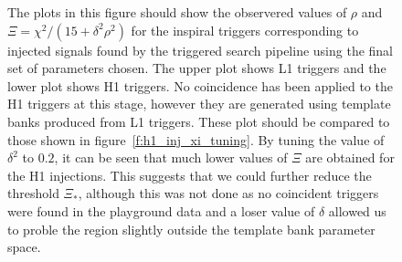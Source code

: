 \begin{figure}[p]
{\label{f:h1_inj_xi_final}%
The plots in this figure should show the observered values of $\rho$ and $\Xi
= \chi^2/(15 + \delta^2\rho^2)$ for the inspiral triggers corresponding to
injected signals found by the triggered search pipeline using the final set of
parameters chosen. The upper plot shows L1 triggers and the lower plot shows
H1 triggers. No coincidence has been applied to the H1 triggers at this stage,
however they are generated using template banks produced from L1 triggers.
These plot should be compared to those shown in
figure~\ref{f:h1_inj_xi_tuning}. By tuning the value of $\delta^2$ to $0.2$,
it can be seen that much lower values of $\Xi$ are obtained for the H1
injections. This suggests that we could further reduce the threshold
$\Xi_\ast$, although this was not done as no coincident triggers were found in
the playground data and a loser value of $\delta$ allowed us to proble the
region slightly outside the template bank parameter space.
}
\end{figure}

